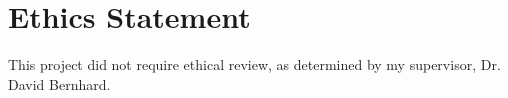 \chapter*{Ethics Statement}
\vspace{1cm}

This project did not require ethical review, as determined by my supervisor,
Dr. David Bernhard.
